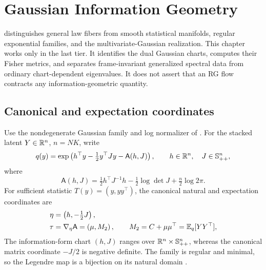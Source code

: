 \chapter{Gaussian Information Geometry}
\label{ch:infogeometry}

 distinguishes general law fibers from smooth
statistical manifolds, regular exponential families, and the
multivariate-Gaussian realization. This chapter works only in the last
tier. It identifies the dual Gaussian charts, computes their Fisher
metrics, and separates frame-invariant generalized spectral data from
ordinary chart-dependent eigenvalues. It does not assert that an RG flow
contracts any information-geometric quantity.

\section{Canonical and expectation coordinates}
\label{sec:ig-expfam}

Use the nondegenerate Gaussian family and log normalizer of
. For the stacked latent
\(Y\in\mathbb R^n\), \(n=NK\), write
\begin{equation}
q(y)=\exp\left(h^\top y-\tfrac12 y^\top Jy-\mathsf A(h,J)\right),
\qquad h\in\mathbb R^n,\quad J\in\mathbb S_{++}^n,
\label{eq:ig-density}
\end{equation}
where
\begin{equation}
\mathsf A(h,J)
=\tfrac12h^\top J^{-1}h-\tfrac12\log\det J+\tfrac n2\log2\pi.
\label{eq:ig-lognormalizer}
\end{equation}
For sufficient statistic \(T(y)=(y,yy^\top)\), the canonical natural and
expectation coordinates are
\begin{align}
\eta&=\left(h,-\tfrac12J\right),
\label{eq:ig-natural}\\
\tau&=\nabla_\eta\mathsf A
=\left(\mu,M_2\right),
\qquad M_2=C+\mu\mu^\top=\mathbb E_q[YY^\top],
\label{eq:ig-expectation}
\end{align}
The information-form chart \((h,J)\) ranges over
\(\mathbb R^n\times\mathbb S_{++}^n\), whereas the canonical matrix coordinate
\(-J/2\) is negative definite. The family is regular and minimal, so the
Legendre map is a bijection on its natural domain
\citep{Brown1986}. 

